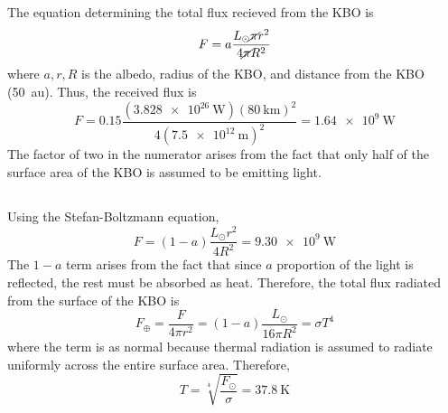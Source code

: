 \documentclass{article}
\begin{document}
\subsection{}

The equation determining the total flux recieved from the KBO is
\begin{equation}
    F = a \frac{L_\odot \cancel{\pi} r^2}{4 \cancel{\pi} R^2}
\end{equation}
where \(a, r, R\) is the albedo, radius of the KBO, and distance from the KBO (\SI{50}{\astronomicalunit}).
Thus, the received flux is
\begin{equation} \label{eq:3a}
    F = 0.15 \frac{(\SI{3.828e+26}{\watt}) (\SI{80}{\kilo\meter})^2}{4 (\SI{7.5e+12}{\meter})^2} = \SI{1.64e+9}{\watt}
\end{equation}
The factor of two in the numerator arises from the fact that only half of the surface area of the KBO is assumed to be emitting light.

\subsection{}

Using the Stefan-Boltzmann equation,
\begin{equation}
    F = (1 - a) \frac{L_\odot r^2}{4 R^2} = \SI{9.30e+9}{\watt}
\end{equation}
The \(1 - a\) term arises from the fact that since \(a\) proportion of the light is reflected, the rest must be absorbed as heat.
Therefore, the total flux radiated from the surface of the KBO is
\begin{equation}
    F_\oplus = \frac{F}{4 \pi r^2} = (1 - a) \frac{L_\odot}{16 \pi R^2} = \sigma T^4
\end{equation}
where the term is as normal because thermal radiation is assumed to radiate uniformly across the entire surface area.
Therefore,
\begin{equation}
    T = \sqrt[4]{\frac{F_\odot}{\sigma}} = \SI{37.8}{\kelvin}
\end{equation}

\subsection{}
\end{document}
